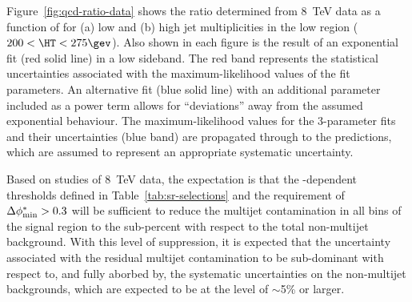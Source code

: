 Figure~\ref{fig:qcd-ratio-data} shows the ratio \rmhtmet determined
from 8~TeV data as a function of \alphat for (a) low and (b) high jet
multiplicities in the low \HT region ($200 < \HT < 275\gev$).  Also
shown in each figure is the result of an exponential fit (red solid
line) in a low \alphat sideband. The red band represents the
statistical uncertainties associated with the maximum-likelihood
values of the fit parameters. An alternative fit (blue solid line)
with an additional parameter included as a power term allows for
``deviations'' away from the assumed exponential behaviour. The
maximum-likelihood values for the 3-parameter fits and their
uncertainties (blue band) are propagated through to the predictions,
which are assumed to represent an appropriate systematic uncertainty.

Based on studies of 8~TeV data, the expectation is that the
\HT-dependent \alphat thresholds defined in
Table~\ref{tab:sr-selections} and the requirement of $\bdphi > 0.3$
will be sufficient to reduce the multijet contamination in all bins of
the signal region to the sub-percent with respect to the total
non-multijet background. With this level of suppression, it is
expected that the uncertainty associated with the residual multijet
contamination to be sub-dominant with respect to, and fully aborbed
by, the systematic uncertainties on the non-multijet backgrounds,
which are expected to be at the level of $\sim$5\% or larger. 

